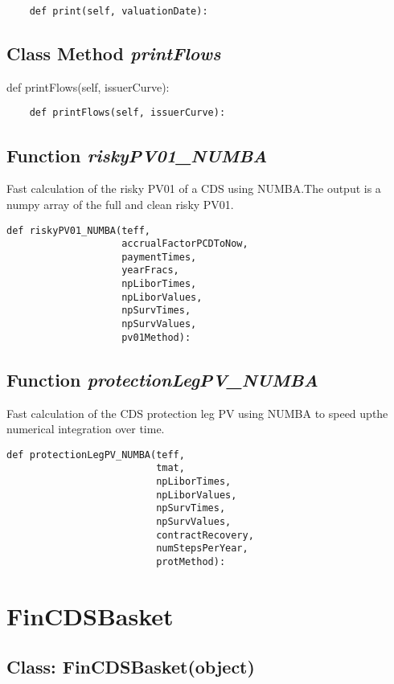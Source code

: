 \documentclass[twoside,11pt]{book}
\begin{document}
\begin{lstlisting}
    def print(self, valuationDate):
\end{lstlisting}

\subsection{Class Method {\it printFlows}}
def printFlows(self, issuerCurve):

\begin{lstlisting}
    def printFlows(self, issuerCurve):
\end{lstlisting}

\subsection{Function {\it riskyPV01\_NUMBA}}
Fast calculation of the risky PV01 of a CDS using NUMBA.The output is a numpy array of the full and clean risky PV01.

\begin{lstlisting}
def riskyPV01_NUMBA(teff,
                    accrualFactorPCDToNow,
                    paymentTimes,
                    yearFracs,
                    npLiborTimes,
                    npLiborValues,
                    npSurvTimes,
                    npSurvValues,
                    pv01Method):
\end{lstlisting}

\subsection{Function {\it protectionLegPV\_NUMBA}}
Fast calculation of the CDS protection leg PV using NUMBA to speed upthe numerical integration over time. 

\begin{lstlisting}
def protectionLegPV_NUMBA(teff,
                          tmat,
                          npLiborTimes,
                          npLiborValues,
                          npSurvTimes,
                          npSurvValues,
                          contractRecovery,
                          numStepsPerYear,
                          protMethod):
\end{lstlisting}

\newpage
\section{FinCDSBasket}

\subsection{Class: FinCDSBasket(object)}
\end{document}
